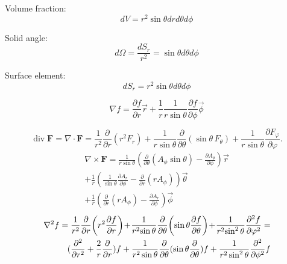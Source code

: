 \documentclass[12pt,a4paper]{article}
\begin{document}
	
	\vspace{.1in}
	Volume fraction: 
	\[ dV = r^2 \sin \theta dr d\theta d\phi \]
	
	\vspace{.1in}
	Solid angle: 
	\[ d\Omega = \frac{dS_r}{r^2} = \sin\theta d\theta d\phi \]
	
	\vspace{.1in}
	Surface element: 
	\[ dS_r = r^2 \sin\theta d\theta d\phi \]
	
	
	\begin{equation}
		\nabla f = \frac{\partial f}{\partial r} \vec{r} + \frac{1}{r} \frac{1}{r \sin \theta} \frac{\partial f}{\partial \phi} \vec{\phi}
	\end{equation}
	
	\begin{equation}
		\operatorname {div} \mathbf {F} =\nabla \cdot \mathbf {F} ={\frac {1}{r^{2}}}{\frac {\partial }{\partial r}}\left(r^{2}F_{r}\right)+{\frac {1}{r\sin \theta }}{\frac {\partial }{\partial \theta }}(\sin \theta \,F_{\theta })+{\frac {1}{r\sin \theta }}{\frac {\partial F_{\varphi }}{\partial \varphi }}.
	\end{equation}
	\begin{equation}
		\begin{aligned}
			\nabla \times \mathbf{F} = \frac{1}{r\sin\theta} (\frac{\partial }{\partial \theta} (A_\phi \sin \theta ) - \frac{\partial A_\theta}{\partial \phi}) \vec{r} \\
			+ \frac{1}{r}(\frac{1}{\sin\theta }\frac{\partial A_r}{\partial \phi} - \frac{\partial}{\partial r }(rA_\phi)) \vec{\theta} \\
			+ \frac{1}{r} (\frac{\partial}{\partial r}(r A_\phi) - \frac{\partial A_r}{\partial \phi}) \vec{\phi}
		\end{aligned}
	\end{equation}
	\begin{equation}
		\begin{aligned}
			\nabla^2 f = {1 \over r^{2}}{\partial  \over \partial r}\!\left(r^{2}{\partial f \over \partial r}\right)\!+\!{1 \over r^{2}\!\sin \theta }{\partial  \over \partial \theta }\!\left(\sin \theta {\partial f \over \partial \theta }\right)\!+\!{1 \over r^{2}\!\sin ^{2}\theta }{\partial ^{2}f \over \partial \varphi ^{2}} = \\ (\frac{\partial^2}{\partial r^2} + \frac{2}{r} \frac{\partial}{\partial r}) f
			+ \frac{1}{r^2 \sin \theta }\frac{\partial}{\partial \theta} (\sin \theta \frac{\partial}{\partial \theta})f
			+ \frac{1}{r^2 \sin ^2 \theta } \frac{\partial ^2}{\partial \phi ^2 } f
		\end{aligned}
	\end{equation}
	
\end{document}
